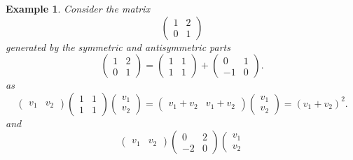 \documentclass[aps,preprint]{revtex4}
\newtheorem{example}[theorem]{Example}
\begin{document}
\begin{example}
Consider the matrix 
\begin{equation}
\left( 
\begin{array}{cc}
1 & 2 \\ 
0 & 1%
\end{array}%
\right)
\end{equation}%
generated by the symmetric and antisymmetric parts 
\begin{equation}
\left( 
\begin{array}{cc}
1 & 2 \\ 
0 & 1%
\end{array}%
\right) =\left( 
\begin{array}{cc}
1 & 1 \\ 
1 & 1%
\end{array}%
\right) +\left( 
\begin{array}{cc}
0 & 1 \\ 
-1 & 0%
\end{array}%
\right) .
\end{equation}%
as%
\begin{equation}
\left( 
\begin{array}{cc}
v_{1} & v_{2}%
\end{array}%
\right) \left( 
\begin{array}{cc}
1 & 1 \\ 
1 & 1%
\end{array}%
\right) \left( 
\begin{array}{c}
v_{1} \\ 
v_{2}%
\end{array}%
\right) =\left( 
\begin{array}{cc}
v_{1}+v_{2} & v_{1}+v_{2}%
\end{array}%
\right) \left( 
\begin{array}{c}
v_{1} \\ 
v_{2}%
\end{array}%
\right) =\left( v_{1}+v_{2}\right) ^{2}.
\end{equation}%
and 
\begin{equation}
\left( 
\begin{array}{cc}
v_{1} & v_{2}%
\end{array}%
\right) \left( 
\begin{array}{cc}
0 & 2 \\ 
-2 & 0%
\end{array}%
\right) \left( 
\begin{array}{c}
v_{1} \\ 
v_{2}%

\end{array}
\end{equation}
\end{example}
\end{document}
